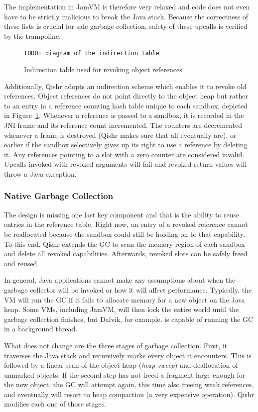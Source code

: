 \documentclass[a4paper,12pt,twoside,openright]{report}
\begin{document}
The implementation in JamVM is therefore very relaxed and code does not even have to be strictly malicious to break the Java stack. Because the correctness of these lists is crucial for safe garbage collection, safety of these upcalls is verified by the trampoline.

\begin{figure}
	\centering
	\texttt{TODO: diagram of the indirection table}
	\caption{Indirection table used for revoking object references}
	\label{fig:IndirectionTable}
\end{figure}

Additionally, Qishr adopts an indirection scheme which enables it to revoke old references. Object references do not point directly to the object heap but rather to an entry in a reference counting hash table unique to each sandbox, depicted in Figure~\ref{fig:IndirectionTable}. Whenever a reference is passed to a sandbox, it is recorded in the JNI frame and its reference count incremented. The counters are decremented whenever a frame is destroyed (Qishr makes sure that all eventually are), or earlier if the sandbox selectively gives up its right to use a reference by deleting it. Any references pointing to a slot with a zero counter are considered invalid. Upcalls invoked with revoked arguments will fail and revoked return values will throw a Java exception.

\subsubsection{Native Garbage Collection}

The design is missing one last key component and that is the ability to reuse entries in the reference table. Right now, an entry of a revoked reference cannot be reallocated because the sandbox could still be holding on to that capability. To this end, Qishr extends the GC to scan the memory region of each sandbox and delete all revoked capabilities. Afterwards, revoked slots can be safely freed and reused.

In general, Java applications cannot make any assumptions about when the garbage collector will be invoked or how it will affect performance. Typically, the VM will run the GC if it fails to allocate memory for a new object on the Java heap. Some VMs, including JamVM, will then lock the entire world until the garbage collection finishes, but Dalvik, for example, is capable of running the GC in a background thread. 

What does not change are the three stages of garbage collection. First, it traverses the Java stack and recursively marks every object it encounters. This is followed by a linear scan of the object heap (\emph{heap sweep}) and deallocation of unmarked objects. If the second step has not freed a fragment large enough for the new object, the GC will attempt again, this time also freeing weak references, and eventually will resort to heap compaction (a very expensive operation). Qishr modifies each one of those stages.
\end{document}
